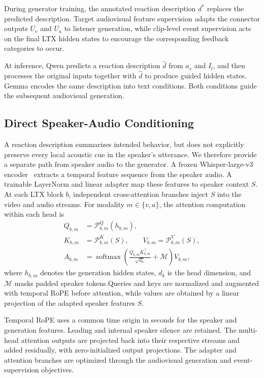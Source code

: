 During generator training, the annotated reaction description
$d^*$ replaces the predicted description. Target audiovisual
feature supervision adapts the connector outputs $U_v$ and
$U_a$ to listener generation, while clip-level event supervision
acts on the final LTX hidden states to encourage the
corresponding feedback categories to occur.

At inference, Qwen predicts a reaction description $\hat d$
from $a_s$ and $I_l$, and then processes the original inputs
together with $\hat d$ to produce guided hidden states.
Gemma encodes the same description into text conditions.
Both conditions guide the subsequent audiovisual generation.

\subsection{Direct Speaker-Audio Conditioning}
\label{sec:direct-audio}
A reaction description summarizes intended behavior, but does not
explicitly preserve every local acoustic cue in the speaker's utterance.
We therefore provide a separate path from speaker audio to the generator.
A frozen Whisper-large-v3 encoder~\cite{whisper} extracts a
temporal feature sequence from the speaker audio. A trainable
LayerNorm and linear adapter map these features to speaker
context $S$. At each LTX block $b$, independent cross-attention
branches inject $S$ into the video and audio streams.
For modality $m\in\{v,a\}$, the attention computation within
each head is
\begin{equation}
\begin{aligned}
    Q_{b,m} &= \mathcal{P}^{Q}_{b,m}(h_{b,m}),\\
    K_{b,m} &= \mathcal{P}^{K}_{b,m}(S),\qquad
    V_{b,m} = \mathcal{P}^{V}_{b,m}(S),\\
    A_{b,m} &= \operatorname{softmax}\!\left(
        \frac{Q_{b,m}K_{b,m}^{\top}}{\sqrt{d_k}}
        +\mathcal{M}
    \right)V_{b,m},
\end{aligned}
\label{eq:speaker-attention}
\end{equation}
where $h_{b,m}$ denotes the generation hidden states,
$d_k$ is the head dimension, and $\mathcal{M}$ masks padded
speaker tokens.Queries and keys are normalized and augmented with temporal
RoPE before attention, while values are obtained by a linear
projection of the adapted speaker features $S$.

Temporal RoPE uses a common time origin in seconds for the
speaker and generation features. Leading and internal speaker
silence are retained. The multi-head attention outputs are
projected back into their respective streams and added
residually, with zero-initialized output projections.
The adapter and attention branches are optimized through
the audiovisual generation and event-supervision objectives.

